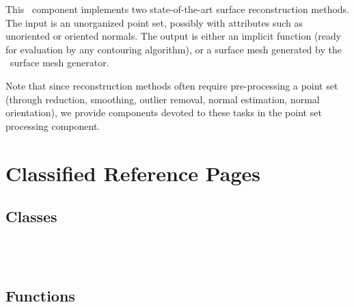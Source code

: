 


This \cgal\ component implements two state-of-the-art surface reconstruction methods. The input is an unorganized point set, possibly with attributes such as unoriented or oriented normals. The output is either an implicit function (ready for evaluation by any contouring algorithm), or a surface mesh generated by the \cgal\ surface mesh generator.

Note that since reconstruction methods often require pre-processing a point set (through reduction, smoothing, outlier removal, normal estimation, normal orientation), we provide components devoted to these tasks in the point set processing component.

\section{Classified Reference Pages}

\subsection{Classes}

  \\
  \\


\subsection{Functions}

  \\
  \\

